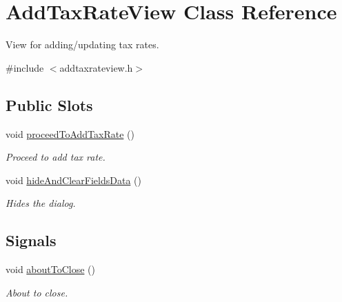 \hypertarget{class_add_tax_rate_view}{\section{\-Add\-Tax\-Rate\-View \-Class \-Reference}
\label{class_add_tax_rate_view}
}


\-View for adding/updating tax rates.  




{\ttfamily \#include $<$addtaxrateview.\-h$>$}

\subsection*{\-Public \-Slots}
\begin{DoxyCompactItemize}
\item 
void \hyperlink{class_add_tax_rate_view_a76e1e81b0bfffb58e3aebb17214564c5}{proceed\-To\-Add\-Tax\-Rate} ()
\begin{DoxyCompactList}\small\item\em \-Proceed to add tax rate. \end{DoxyCompactList}\item 
void \hyperlink{class_add_tax_rate_view_ae8f30eb5ef1c05fee5434b6c29d2b528}{hide\-And\-Clear\-Fields\-Data} ()
\begin{DoxyCompactList}\small\item\em \-Hides the dialog. \end{DoxyCompactList}\end{DoxyCompactItemize}
\subsection*{\-Signals}
\begin{DoxyCompactItemize}
\item 
void \hyperlink{class_add_tax_rate_view_a4e4eb6c12257f24c15970a53d5ff1b0c}{about\-To\-Close} ()
\begin{DoxyCompactList}\small\item\em \-About to close. \end{DoxyCompactList}\end{DoxyCompactItemize}
